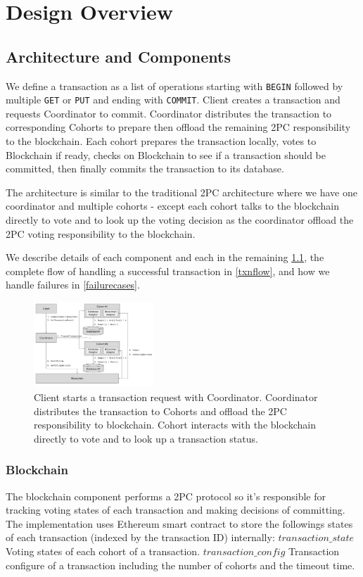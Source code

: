 \documentclass[11pt,conference]{IEEEtran}
\begin{document}
\section{Design Overview}
\subsection{Architecture and Components} \label{components}
We define a transaction as a list of operations starting with \texttt{BEGIN} followed by multiple \texttt{GET} or \texttt{PUT} and ending with \texttt{COMMIT}. Client creates a transaction and requests Coordinator to commit. Coordinator distributes the transaction to corresponding Cohorts to prepare then offload the remaining 2PC responsibility to the blockchain. Each cohort prepares the transaction locally, votes to Blockchain if ready, checks on Blockchain to see if a transaction should be committed, then finally commits the transaction to its database.

The architecture is similar to the traditional 2PC architecture where we have one coordinator and multiple cohorts - except each cohort talks to the blockchain directly to vote and to look up the voting decision as the coordinator offload the 2PC voting responsibility to the blockchain.

We describe details of each component and each in the remaining \ref{components}, the complete flow of handling a successful transaction in \ref{txnflow}, and how we handle failures in \ref{failurecases}.
\begin{figure}[h]
\centering
\includegraphics[width=0.4\textwidth]{./diagram.png}
\caption{Client starts a transaction request with Coordinator. Coordinator distributes the transaction to Cohorts and offload the 2PC responsibility to blockchain. Cohort interacts with the blockchain directly to vote and to look up a transaction status.}
\label{fig:Panel}
\end{figure}

\subsubsection{Blockchain} \label{blockchain}
The blockchain component performs a 2PC protocol so it’s responsible for tracking voting states of each transaction and making decisions of committing. The implementation uses Ethereum smart contract to store the followings states of each transaction (indexed by the transaction ID) internally:
$transaction\_state$ Voting states of each cohort of a transaction.
$transaction\_config$ Transaction configure of a transaction including the number of cohorts and the timeout time.
\end{document}
